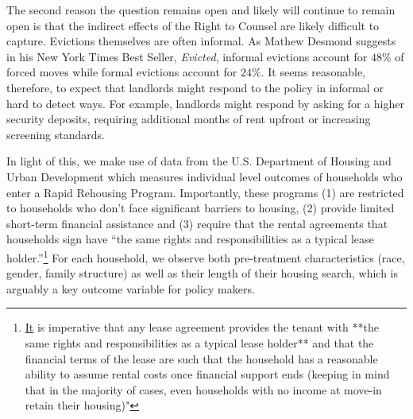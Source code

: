 \documentclass[a4paper,12pt]{article}
\begin{document}
The second reason the question remains open and likely will continue to remain open is that the indirect effects of the Right to Counsel are likely difficult to capture. Evictions themselves are often informal. As Mathew Desmond suggests in his New York Times Best Seller, \textit{Evicted}, informal evictions account for $48\%$ of forced moves while formal evictions account for $24\%$. It seems reasonable, therefore, to expect that landlords might respond to the policy in informal or hard to detect ways. For example, landlords might respond by asking for a higher security deposits, requiring additional months of rent upfront or increasing screening standards. \par 
In light of this, we make use of data from the U.S. Department of Housing and Urban Development which measures individual level outcomes of households who enter a Rapid Rehousing Program. Importantly, these programs (1) are restricted to households who don't face significant barriers to housing, (2) provide limited short-term financial assistance and (3) require that the rental agreements that households sign have ``the same rights and responsibilities as a typical lease holder.''\footnote{\href{thttps://endhomelessness.org/resource/rapid-re-housing-a-history-and-core-components/}{It} is imperative that any lease agreement provides the tenant with **the same rights and responsibilities as a typical lease holder** and that the financial terms of the lease are such that the household has a reasonable ability to assume rental costs once financial support ends (keeping in mind that in the majority of cases, even households with no income at move-in retain their housing)"} For each household, we observe both pre-treatment characteristics (race, gender, family structure) as well as their length of their housing search, which is arguably a key outcome variable for policy makers. \par 
\end{document}
